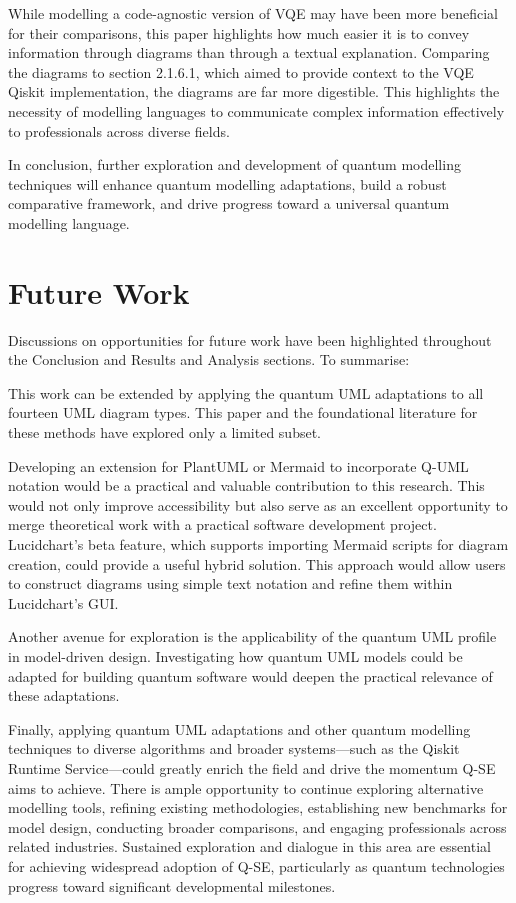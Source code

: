 \documentclass{article}
\begin{document}
While modelling a code-agnostic version of VQE may have been more beneficial for their comparisons, this paper highlights how much easier it is to convey information through diagrams than through a textual explanation. Comparing the diagrams to section 2.1.6.1, which aimed to provide context to the VQE Qiskit implementation, the diagrams are far more digestible. This highlights the necessity of modelling languages to communicate complex information effectively to professionals across diverse fields.

In conclusion, further exploration and development of quantum modelling techniques will enhance quantum modelling adaptations, build a robust comparative framework, and drive progress toward a universal quantum modelling language.

\section{Future Work}

Discussions on opportunities for future work have been highlighted throughout the Conclusion and Results and Analysis sections. To summarise:

This work can be extended by applying the quantum UML adaptations to all fourteen UML diagram types. This paper and the foundational literature for these methods have explored only a limited subset.

Developing an extension for PlantUML or Mermaid to incorporate Q-UML notation would be a practical and valuable contribution to this research. This would not only improve accessibility but also serve as an excellent opportunity to merge theoretical work with a practical software development project. Lucidchart's beta feature, which supports importing Mermaid scripts for diagram creation, could provide a useful hybrid solution. This approach would allow users to construct diagrams using simple text notation and refine them within Lucidchart's GUI.

Another avenue for exploration is the applicability of the quantum UML profile in model-driven design. Investigating how quantum UML models could be adapted for building quantum software would deepen the practical relevance of these adaptations.

Finally, applying quantum UML adaptations and other quantum modelling techniques to diverse algorithms and broader systems—such as the Qiskit Runtime Service—could greatly enrich the field and drive the momentum Q-SE aims to achieve. There is ample opportunity to continue exploring alternative modelling tools, refining existing methodologies, establishing new benchmarks for model design, conducting broader comparisons, and engaging professionals across related industries. Sustained exploration and dialogue in this area are essential for achieving widespread adoption of Q-SE, particularly as quantum technologies progress toward significant developmental milestones.
\end{document}
